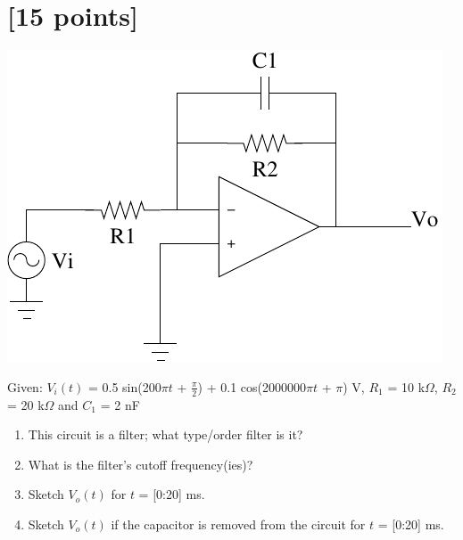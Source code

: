 

\section{[15 points]}

\begin{center}
\includegraphics[width=0.4\linewidth]{active_lpf}
\end{center}

Given: $V_i(t)$ = 0.5 sin(200$\pi t$ + $\frac{\pi}{2}$) + 0.1 cos(2000000$\pi t$
+ $\pi$) V, $R_1$ = 10 k$\Omega$, $R_2$ = 20 k$\Omega$ and $C_1$ = 2 nF

\begin{enumerate}
    \item This circuit is a filter; what type/order filter is it?
    \item What is the filter's cutoff frequency(ies)?
    \item Sketch $V_o(t)$ for $t$ = [0:20] ms.
    \item Sketch $V_o(t)$ if the capacitor is removed from the circuit for $t$ = [0:20] ms.
\end{enumerate}

\clearpage



\clearpage

